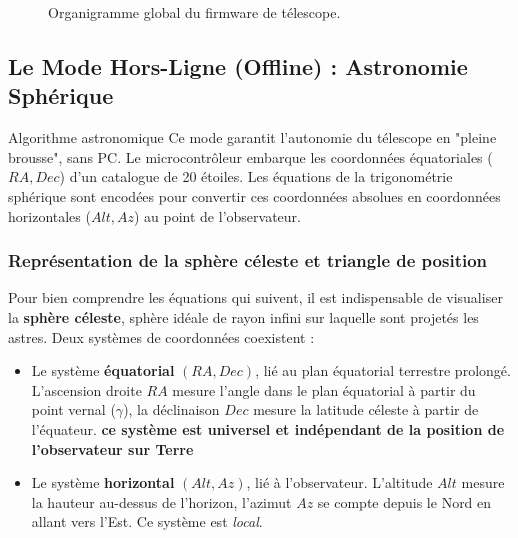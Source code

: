 \documentclass[12pt,a4paper]{report}
\begin{document}
\begin{enumerate}
\begin{figure}[H]
    \caption{Organigramme global du firmware de télescope.}
    \label{fig:organigramme_global}
\end{figure}

\subsection{Le Mode Hors-Ligne (Offline) : Astronomie Sphérique}
\begin{remarque}{Algorithme astronomique}
Ce mode garantit l'autonomie du télescope en "pleine brousse", sans PC. Le microcontrôleur embarque les coordonnées équatoriales ($RA, Dec$) d'un catalogue de 20 étoiles. Les équations de la trigonométrie sphérique sont encodées pour convertir ces coordonnées absolues en coordonnées horizontales ($Alt, Az$) au point de l'observateur.
\end{remarque}

\subsubsection{Représentation de la sphère céleste et triangle de position}
Pour bien comprendre les équations qui suivent, il est indispensable de visualiser la \textbf{sphère céleste}, sphère idéale de rayon infini sur laquelle sont projetés les astres. Deux systèmes de coordonnées coexistent :
\begin{itemize}
    \item Le système \textbf{équatorial} $(RA, Dec)$, lié au plan équatorial terrestre prolongé. L'ascension droite $RA$ mesure l'angle dans le plan équatorial à partir du point vernal ($\gamma$), la déclinaison $Dec$ mesure la latitude céleste à partir de l'équateur.\textbf{ ce système est universel et indépendant de la position de l’observateur sur Terre}
    \item Le système \textbf{horizontal} $(Alt, Az)$, lié à l'observateur. L'altitude $Alt$ mesure la hauteur au-dessus de l'horizon, l'azimut $Az$ se compte depuis le Nord en allant vers l'Est. Ce système est \textit{local}.
\end{itemize}


\end{enumerate}
\end{document}
